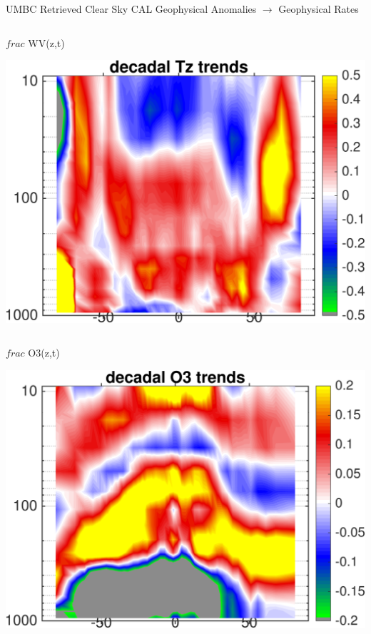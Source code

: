 \documentclass[10pt,t]{beamer}
\begin{document}
\begin{frame}{UMBC Retrieved Clear Sky CAL Geophysical Anomalies $\rightarrow$ Geophysical Rates}
\begin{columns}
\begin{column}{0.45\columnwidth}
\begin{block}{\footnotesize $frac$ WV(z,t)}
\vspace{-0.1in}
\begin{center}
\includegraphics[width=\linewidth]{Figs/ClearAnom/umbc_clr_retr_cal_wv_rate_200209_201808.png}
\end{center}
\end{block}
\end{column}
\end{columns}

\vspace{-0.25in}

\begin{columns}
\begin{column}{0.45\columnwidth}
\begin{block}{\footnotesize $frac$ O3(z,t)}
\vspace{-0.1in}
\begin{center}
\includegraphics[width=\linewidth]{Figs/ClearAnom/umbc_clr_retr_cal_o3_rate_200209_201808.png}
\end{center}
\end{block}
\end{column}


\end{columns}
\end{frame}
\end{document}
